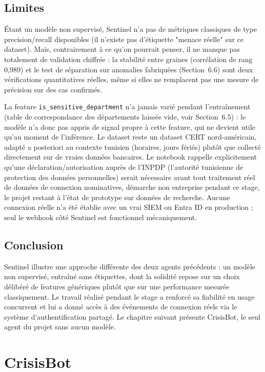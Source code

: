 \documentclass[12pt,a4paper]{report}
\begin{document}
\section{Limites}

Étant un modèle non supervisé, Sentinel n'a pas de métriques classiques de type precision/recall disponibles (il n'existe pas d'étiquette "menace réelle" sur ce dataset). Mais, contrairement à ce qu'on pourrait penser, il ne manque pas totalement de validation chiffrée : la stabilité entre graines (corrélation de rang 0,989) et le test de séparation sur anomalies fabriquées (Section~6.6) sont deux vérifications quantitatives réelles, même si elles ne remplacent pas une mesure de précision sur des cas confirmés.

La feature \texttt{is\_sensitive\_department} n'a jamais varié pendant l'entraînement (table de correspondance des départements laissée vide, voir Section~6.5) : le modèle n'a donc pas appris de signal propre à cette feature, qui ne devient utile qu'au moment de l'inférence. Le dataset reste un dataset CERT nord-américain, adapté a posteriori au contexte tunisien (horaires, jours fériés) plutôt que collecté directement sur de vraies données bancaires. Le notebook rappelle explicitement qu'une déclaration/autorisation auprès de l'INPDP (l'autorité tunisienne de protection des données personnelles) serait nécessaire avant tout traitement réel de données de connexion nominatives, démarche non entreprise pendant ce stage, le projet restant à l'état de prototype sur données de recherche. Aucune connexion réelle n'a été établie avec un vrai SIEM ou Entra ID en production ; seul le webhook côté Sentinel est fonctionnel mécaniquement.

\section{Conclusion}

Sentinel illustre une approche différente des deux agents précédents : un modèle non supervisé, entraîné sans étiquettes, dont la solidité repose sur un choix délibéré de features génériques plutôt que sur une performance mesurée classiquement. Le travail réalisé pendant le stage a renforcé sa fiabilité en usage concurrent et lui a donné accès à des événements de connexion réels via le système d'authentification partagé. Le chapitre suivant présente CrisisBot, le seul agent du projet sans aucun modèle.

\chapter{CrisisBot}
\end{document}
